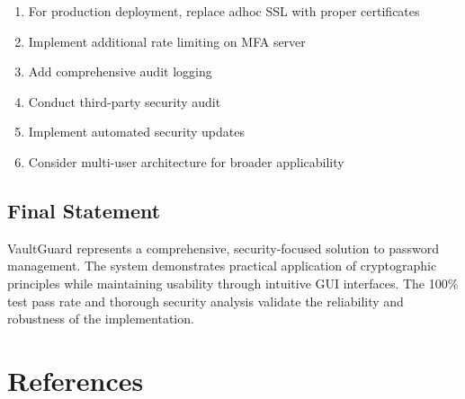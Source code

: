 \documentclass[12pt,a4paper]{report}
\begin{document}
\begin{enumerate}
    \item For production deployment, replace adhoc SSL with proper certificates
    \item Implement additional rate limiting on MFA server
    \item Add comprehensive audit logging
    \item Conduct third-party security audit
    \item Implement automated security updates
    \item Consider multi-user architecture for broader applicability
\end{enumerate}

\section{Final Statement}

VaultGuard represents a comprehensive, security-focused solution to password management. The system demonstrates practical application of cryptographic principles while maintaining usability through intuitive GUI interfaces. The 100\% test pass rate and thorough security analysis validate the reliability and robustness of the implementation.

\chapter*{References}
\end{document}
